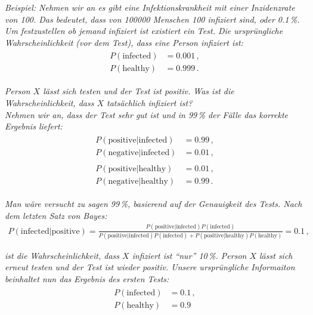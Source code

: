 \textit{Beispiel: Nehmen wir an es gibt eine Infektionskrankheit mit einer Inzidenzrate von 100. Das bedeutet, dass von 100000 Menschen 100 infiziert sind, oder 0.1\,\%. Um festzustellen ob jemand infiziert ist existiert ein Test. Die urspr\"ungliche Wahrscheinlichkeit (vor dem Test), dass eine Person infiziert ist:}
\begin{align}
\begin{split}
P ( \text{infected} ) & = 0.001\,,\\
P ( \text{healthy} ) & = 0.999\,.
\end{split}
\label{eq:vl4-36}
\end{align}

\textit{Person $X$ l\"asst sich testen und der Test ist positiv. Was ist die Wahrscheinlichkeit, dass $X$ tats\"achlich infiziert ist? \\[0.3cm]
Nehmen wir an, dass der Test sehr gut ist und in 99\,\% der F\"alle das korrekte Ergebnis liefert:}
\begin{align}
\begin{split}
P ( \text{positive$|$infected} ) & = 0.99\,,\\
P ( \text{negative$|$infected} ) & = 0.01\,,\\
& \\
P ( \text{positive$|$healthy} ) & = 0.01\,,\\
P ( \text{negative$|$healthy} ) & = 0.99\,.
\end{split}
\label{eq:vl4-37}
\end{align}

\textit{Man w\"are versucht zu sagen 99\,\%, basierend auf der Genauigkeit des Tests. Nach dem letzten Satz von Bayes:}
\begin{align}
P( \text{infected$|$positive} ) =  \frac{ P( \text{positive$|$infected} ) P( \text{infected} ) }{ P( \text{positive$|$infected} ) P( \text{infected} ) + P( \text{positive$|$healthy} ) P( \text{healthy} ) } = 0.1\,,
\label{eq:vl4-38}
\end{align}

\textit{ist die Wahrscheinlichkeit, dass $X$ infiziert ist ``nur'' 10\,\%. Person $X$ l\"asst sich erneut testen und der Test ist wieder positiv. Unsere urspr\"ungliche Informaiton beinhaltet nun das Ergebnis des ersten Tests:}
\begin{align}
\begin{split}
P ( \text{infected} ) & = 0.1\,,\\
P ( \text{healthy} ) & = 0.9
\end{split}
\label{eq:vl4-39}
\end{align}

